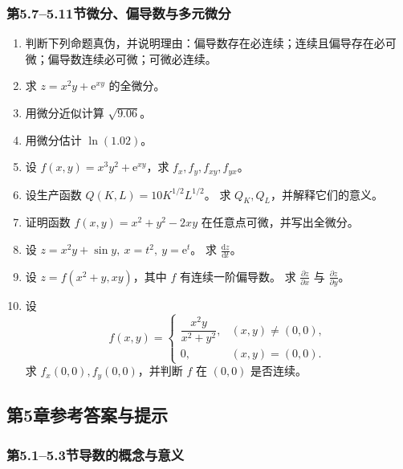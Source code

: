 \documentclass[fontset=fandol]{ctexart}
\newcommand{\dd}{\mathrm{d}}
\newcommand{\ee}{\mathrm{e}}
\begin{document}
\subsubsection*{第5.7--5.11节\quad 微分、偏导数与多元微分}

\begin{enumerate}[label=\textbf{练习\arabic*.},leftmargin=2.2em]
\item 判断下列命题真伪，并说明理由：偏导数存在必连续；连续且偏导存在必可微；偏导数连续必可微；可微必连续。
\item 求 $z=x^2y+\ee^{xy}$ 的全微分。
\item 用微分近似计算 $\sqrt{9.06}$。
\item 用微分估计 $\ln(1.02)$。
\item 设 $f(x,y)=x^3y^2+\ee^{xy}$，求 $f_x,f_y,f_{xy},f_{yx}$。
\item 设生产函数 $Q(K,L)=10K^{1/2}L^{1/2}$。 求 $Q_K,Q_L$，并解释它们的意义。
\item 证明函数 $f(x,y)=x^2+y^2-2xy$ 在任意点可微，并写出全微分。
\item 设 $z=x^2y+\sin y,\ x=t^2,\ y=\ee^t$。 求 $\frac{\dd z}{\dd t}$。
\item 设 $z=f(x^2+y,xy)$，其中 $f$ 有连续一阶偏导数。 求 $\frac{\partial z}{\partial x}$ 与 $\frac{\partial z}{\partial y}$。
\item 设
\[
f(x,y)=
\begin{cases}
\dfrac{x^2y}{x^2+y^2},&(x,y)\neq(0,0),\\[0.6em]
0,&(x,y)=(0,0).
\end{cases}
\]
求 $f_x(0,0),f_y(0,0)$，并判断 $f$ 在 $(0,0)$ 是否连续。
\end{enumerate}

\subsection*{第5章参考答案与提示}

\subsubsection*{第5.1--5.3节\quad 导数的概念与意义}
\end{document}

